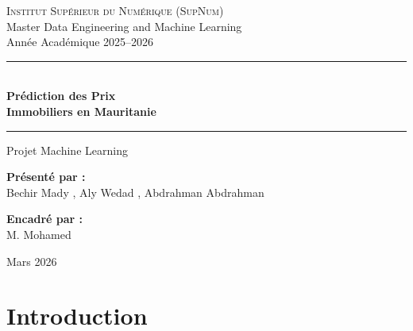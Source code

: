\documentclass[12pt, a4paper]{article}
\begin{document}
\begin{titlepage}
\begin{center}

\vspace*{1cm}

{\large\textsc{Institut Supérieur du Numérique (SupNum)}}\\[0.3cm]
{\normalsize Master Data Engineering and Machine Learning}\\[0.3cm]
{\normalsize Année Académique 2025--2026}

\vspace{1.5cm}

\rule{\textwidth}{1.5pt}\\[0.6cm]
{\Huge\bfseries\textcolor{supnum-blue}{Prédiction des Prix\\[0.3cm] Immobiliers en Mauritanie}}\\[0.4cm]
\rule{\textwidth}{1.5pt}

\vspace{1cm}

{\Large Projet Machine Learning}

\vspace{2cm}

\begin{minipage}{0.45\textwidth}
\begin{flushleft}
\textbf{Présenté par :}\\[0.2cm]
{\large Bechir Mady , Aly Wedad , Abdrahman Abdrahman}
\end{flushleft}
\end{minipage}
\hfill
\begin{minipage}{0.45\textwidth}
\begin{flushright}
\textbf{Encadré par :}\\[0.2cm]
{\large M. Mohamed}
\end{flushright}
\end{minipage}

\vfill

{\large Mars 2026}

\end{center}
\end{titlepage}

\tableofcontents
\newpage

\section{Introduction}
\end{document}
